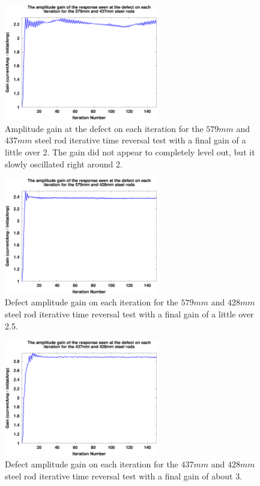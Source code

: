 \begin{figure}[ht!]
\centering
\includegraphics[width=0.6\textwidth]{eps_pics/steel-1-2_iterationVsGain.eps}
\caption{Amplitude gain at the defect on each iteration for the $579 mm$ and $437 mm$ steel rod iterative time reversal test with a final gain of a little over 2. The gain did not appear to completely level out, but it slowly oscillated right around 2.
	 \label{fig:steelIter1}} 
\end{figure}
  
\begin{figure}[ht!]
\centering
\includegraphics[width=0.6\textwidth]{eps_pics/steel-1-3_iterationVsGain.eps}
\caption{Defect amplitude gain on each iteration for the $579 mm$ and $428 mm$ steel rod iterative time reversal test with a final gain of a little over 2.5.
 	 \label{fig:steelIter2}} 
\end{figure}

\begin{figure}[ht!]
\centering
\includegraphics[width=0.6\textwidth]{eps_pics/steel-2-3_iterationVsGain.eps}
\caption{Defect amplitude gain on each iteration for the $437 mm$ and $428 mm$ steel rod iterative time reversal test with a final gain of about 3.
  	 \label{fig:steelIter3}} 
\end{figure}

